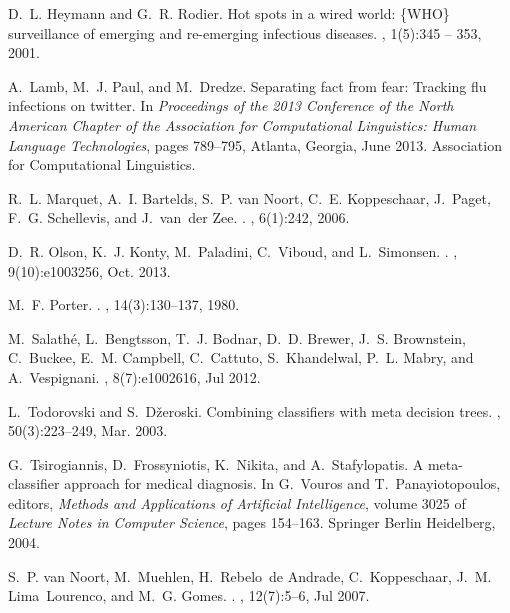 \documentclass{sig-alternate-2013}
\begin{document}
\begin{thebibliography}{10}
D.~L. Heymann and G.~R. Rodier.
\newblock Hot spots in a wired world: \{WHO\} surveillance of emerging and
  re-emerging infectious diseases.
, 1(5):345 -- 353, 2001.

A.~Lamb, M.~J. Paul, and M.~Dredze.
\newblock Separating fact from fear: Tracking flu infections on twitter.
\newblock In {\em Proceedings of the 2013 Conference of the North American
  Chapter of the Association for Computational Linguistics: Human Language
  Technologies}, pages 789--795, Atlanta, Georgia, June 2013. Association for
  Computational Linguistics.

R.~L. Marquet, A.~I. Bartelds, S.~P. van Noort, C.~E. Koppeschaar, J.~Paget,
  F.~G. Schellevis, and J.~van~der Zee.
.
, 6(1):242, 2006.

D.~R. Olson, K.~J. Konty, M.~Paladini, C.~Viboud, and L.~Simonsen.
.
, 9(10):e1003256, Oct. 2013.

M.~F. Porter.
.
,
  14(3):130--137, 1980.

M.~Salath{\'e}, L.~Bengtsson, T.~J. Bodnar, D.~D. Brewer, J.~S. Brownstein,
  C.~Buckee, E.~M. Campbell, C.~Cattuto, S.~Khandelwal, P.~L. Mabry, and
  A.~Vespignani.
, 8(7):e1002616, Jul 2012.

L.~Todorovski and S.~D\v{z}eroski.
\newblock Combining classifiers with meta decision trees.
, 50(3):223--249, Mar. 2003.

G.~Tsirogiannis, D.~Frossyniotis, K.~Nikita, and A.~Stafylopatis.
\newblock A meta-classifier approach for medical diagnosis.
\newblock In G.~Vouros and T.~Panayiotopoulos, editors, {\em Methods and
  Applications of Artificial Intelligence}, volume 3025 of {\em Lecture Notes
  in Computer Science}, pages 154--163. Springer Berlin Heidelberg, 2004.

S.~P. van Noort, M.~Muehlen, H.~Rebelo~de Andrade, C.~Koppeschaar, J.~M.
  Lima~Lourenco, and M.~G. Gomes.
.
, 12(7):5--6, Jul 2007.

\end{thebibliography}
\end{document}
